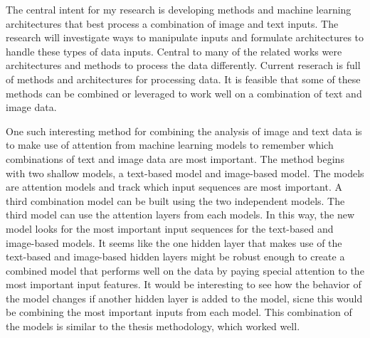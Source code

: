 The central intent for my research is developing methods and machine learning architectures that best process a combination of image and text inputs. The research will investigate ways to manipulate inputs and formulate architectures to handle these types of data inputs.  Central to many of the related works were architectures and methods to process the data differently.  Current reserach is full of methods and architectures for processing data. It is feasible that some of these methods can be combined or leveraged to work well on a combination of text and image data.

One such interesting method for combining the analysis of image and text data is to make use of attention from machine learning models to remember which combinations of text and image data are most important.  The method begins with two shallow models, a text-based model and image-based model.  The models are attention models and track which input sequences are most important.  A third combination model can be built using the two independent models.  The third model can use the attention layers from each models.  In this way, the new model looks for the most important input sequences for the text-based and image-based models. It seems like the one hidden layer that makes use of the text-based and image-based hidden layers might be robust enough to create a combined model that performs well on the data by paying special attention to the most important input features.  It would be interesting to see how the behavior of the model changes if another hidden layer is added to the model, sicne this would be combining the most important inputs from each model.  This combination of the models is similar to the thesis methodology, which worked well.  
